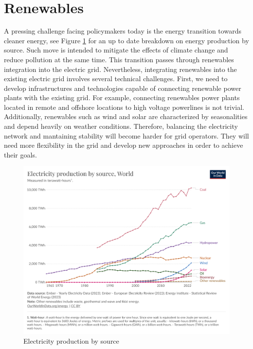\section{Renewables}
A pressing challenge facing policymakers today is the energy transition towards cleaner energy, see Figure \ref{fig:electricity_production_by_source} for an up to date breakdown on energy production by source. Such move is intended to mitigate the effects of climate change and reduce pollution at the same time.
This transition passes through renewables integration into the electric grid. 
Nevertheless, integrating renewables into the existing electric grid involves several technical challenges. First, we need to develop infrastructures and technologies capable of connecting renewable power plants with the existing grid. For example, connecting renewables power plants located in remote and offshore locations to high voltage powerlines is not trivial.
Additionally, renewables such as wind and solar are characterized by seasonalities and depend heavily on weather conditions. Therefore, balancing the electricity network and mantaining stability will become harder for grid operators. They will need more flexibility in the grid and develop new approaches in order to achieve their goals.

\begin{figure}[!h]
    \includegraphics[width=\textwidth]{images/electricity-production-by-source.png}
    \caption{Electricity production by source \cite{energy2023statistical}}    
    \label{fig:electricity_production_by_source}
\end{figure}

